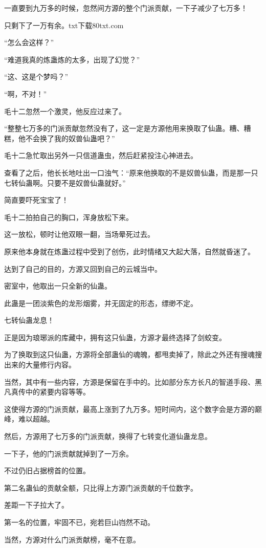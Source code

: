 \begin{this_body}
一直要到九万多的时候，忽然间方源的整个门派贡献，一下子减少了七万多！

只剩下了一万有余。txt下载80txt.com

“怎么会这样？”

“难道我真的炼蛊炼的太多，出现了幻觉？”

“这、这是个梦吗？”

“啊，不对！”

毛十二忽然一个激灵，他反应过来了。

“整整七万多的门派贡献忽然没有了，这一定是方源他用来换取了仙蛊。糟、糟糕，他不会换了我的奴兽仙蛊吧？”

毛十二急忙取出另外一只信道蛊虫，然后赶紧投注心神进去。

查看了之后，他长长地吐出一口浊气：“原来他换取的不是奴兽仙蛊，而是那一只七转仙蛊啊。只要不是奴兽仙蛊就好。”

简直要吓死宝宝了！

毛十二拍拍自己的胸口，浑身放松下来。

这一放松，顿时让他双眼一翻，当场晕死过去。

原来他本身就在炼蛊过程中受到了创伤，此时情绪又大起大落，自然就昏迷了。

达到了自己的目的，方源又回到自己的云城当中。

密室中，他取出一只全新的仙蛊。

此蛊是一团淡紫色的龙形烟雾，并无固定的形态，缥缈不定。

七转仙蛊龙息！

正是因为琅琊派的库藏中，拥有这只仙蛊，方源才最终选择了剑蛟变。

为了换取到这只仙蛊，方源将全部蛊仙的魂魄，都甩卖掉了，除此之外还有搜魂搜出来的大量修行内容。

当然，其中有一些内容，方源是保留在手中的。比如部分东方长凡的智道手段、黑凡真传中的紧要内容等等。

这使得方源的门派贡献，最高上涨到了九万多。短时间内，这个数字会是方源的巅峰，难以超越。

然后，方源用了七万多的门派贡献，换得了七转变化道仙蛊龙息。

一下子，他的门派贡献就掉到了一万余。

不过仍旧占据榜首的位置。

第二名蛊仙的贡献全额，只比得上方源门派贡献的千位数字。

差距一下子拉大了。

第一名的位置，牢固不已，宛若巨山岿然不动。

当然，方源对什么门派贡献榜，毫不在意。


\end{this_body}
